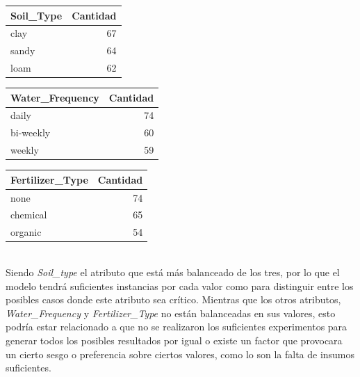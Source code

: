 \documentclass[12pt,a4paper]{article}
\begin{document}
{{            \begin{minipage}{0.5\textwidth}
                \centering
                \begin{tabular}{lr}
                    \toprule
                        \textbf{Soil\_Type} & \textbf{Cantidad} \\
                    \midrule
                        clay & 67 \\
                        sandy & 64 \\
                        loam & 62 \\
                    \bottomrule
                \end{tabular}
            \end{minipage}%
            \begin{minipage}{0.5\textwidth}
                \centering
                \begin{tabular}{lr}
                    \toprule
                        \textbf{Water\_Frequency} & \textbf{Cantidad} \\
                    \midrule
                        daily & 74 \\
                        bi-weekly & 60 \\
                        weekly & 59 \\
                    \bottomrule
                \end{tabular}
            \end{minipage}%

            \begin{minipage}{\textwidth}
                \centering
                \begin{tabular}{lr}
                    \toprule
                        \textbf{Fertilizer\_Type} & \textbf{Cantidad} \\
                    \midrule
                        none & 74 \\
                        chemical & 65 \\
                        organic & 54 \\
                    \bottomrule
                \end{tabular}
            \end{minipage}\\

            Siendo \emph{Soil\_type} el atributo que está más balanceado de los tres, por lo que 
            el modelo tendrá suficientes instancias por cada valor como para distinguir entre los 
            posibles casos donde este atributo sea crítico. Mientras que los otros atributos, \emph{Water\_Frequency} 
            y \emph{Fertilizer\_Type} no están balanceadas en sus valores, esto podría estar 
            relacionado a que no se realizaron los suficientes experimentos para generar todos los 
            posibles resultados por igual o existe un factor que provocara un cierto sesgo o preferencia 
            sobre ciertos valores, como lo son la falta de insumos suficientes.

}}
\end{document}
